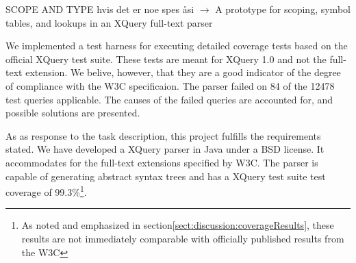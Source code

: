 SCOPE AND TYPE hvis det er noe spes \aa si $\rightarrow$ A prototype for scoping, symbol tables, and lookups in an XQuery full-text parser

We implemented a test harness for executing detailed coverage tests based on the official XQuery test suite\cite{w3c05}. These tests are meant for XQuery 1.0 and not the full-text extension. We belive, however, that they are a good indicator of the degree of compliance with the W3C specificaion. The parser failed on 84 of the 12478 test queries applicable. The causes of the failed queries are accounted for, and possible solutions are presented.

As as response to the task description, this project fulfills the requirements stated. We have developed a XQuery parser in Java under a BSD license. It accommodates for the full-text extensions specified by W3C. The parser is capable of generating abstract syntax trees and has a XQuery test suite test coverage of 99.3\%\footnote{As noted and emphasized in section\ref{sect:discussion:coverageResults}, these results are not immediately comparable with officially published results from the W3C}.
